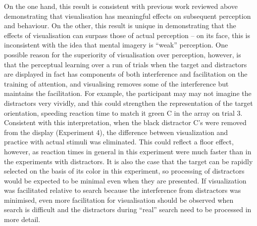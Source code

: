 \documentclass[smallextended]{svjour3}       %
\begin{document}
On the one hand, this result is consistent with previous work reviewed above demonstrating that visualisation has meaningful effects on subsequent perception and behaviour. On the other, this result is unique in demonstrating that the effects of visualisation can surpass those of actual perception -- on its face, this is inconsistent with the idea that mental imagery is ``weak'' perception. One possible reason for the superiority of visualisation over perception, however, is that the perceptual learning over a run of trials when the target and distractors are displayed in fact has components of both interference and facilitation on the training of attention, and visualising removes some of the interference but maintains the facilitation. For example, the participant may may not imagine the distractors very vividly, and this could strengthen the representation of the target orientation, speeding reaction time to match it green C in the array on trial 3. Consistent with this interpretation, when the black distractor C's were removed from the display (Experiment 4), the difference between visualization and practice with actual stimuli was eliminated. This could reflect a floor effect, however, as reaction times in general in this experiment were much faster than in the experiments with distractors. It is also the case that the target can be rapidly selected on the basis of its color in this experiment, so processing of distractors would be expected to be minimal even when they are presented. If visualization was facilitated relative to search because the interference from distractors was minimised, even more facilitation for visualisation should be observed when search is difficult and the distractors during ``real'' search need to be processed in more detail. 
\end{document}
